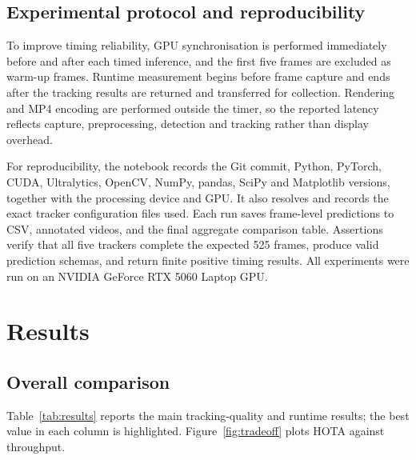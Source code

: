 \documentclass[11pt,a4paper]{article}
\begin{document}
\subsection{Experimental protocol and reproducibility}

To improve timing reliability, GPU synchronisation is performed immediately before and after each timed inference, and the first five frames are excluded as warm-up frames. Runtime measurement begins before frame capture and ends after the tracking results are returned and transferred for collection. Rendering and MP4 encoding are performed outside the timer, so the reported latency reflects capture, preprocessing, detection and tracking rather than display overhead.

For reproducibility, the notebook records the Git commit, Python, PyTorch, CUDA, Ultralytics, OpenCV, NumPy, pandas, SciPy and Matplotlib versions, together with the processing device and GPU. It also resolves and records the exact tracker configuration files used. Each run saves frame-level predictions to CSV, annotated videos, and the final aggregate comparison table. Assertions verify that all five trackers complete the expected 525 frames, produce valid prediction schemas, and return finite positive timing results. All experiments were run on an NVIDIA GeForce RTX 5060 Laptop GPU.

\section{Results}

\subsection{Overall comparison}

Table~\ref{tab:results} reports the main tracking-quality and runtime results; the best value in each column is highlighted. Figure~\ref{fig:tradeoff} plots HOTA against throughput.
\end{document}

